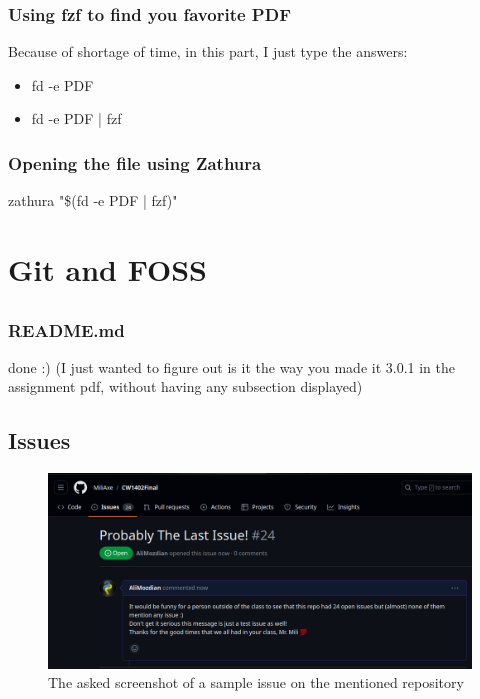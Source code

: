 \documentclass[12pt]{article}
\begin{document}
	\subsubsection{Using fzf to find you favorite PDF}
	Because of shortage of time, in this part, I just type the answers:
	\begin{itemize}
		
		\item fd -e PDF

		\item fd -e PDF | fzf

	\end{itemize}

	\subsubsection{Opening the file using Zathura}
	zathura "\$(fd -e PDF | fzf)"


	\section{Git and FOSS}
	\subsection*{}
	\subsubsection{README.md}
	done :) (I just wanted to figure out is it the way you made it 3.0.1 in the assignment pdf, without having any subsection displayed)

	\subsection{Issues}

	\begin{figure}[H]
		\centering
		\includegraphics[width=\textwidth]{images/ss8.png}
		\caption{The asked screenshot of a sample issue on the mentioned repository}
	\end{figure}
	
\end{document}
